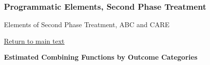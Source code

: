 \documentclass[static]{JJH-Beamer}
\begin{document}
\begin{frame}
\frametitle{Programmatic Elements, Second Phase Treatment}
	
\begin{table}[H]
\caption{Elements of Second Phase Treatment, ABC and CARE}
\begin{center}
\end{center}
\end{table}

\end{frame}

\begin{frame}

\begin{center}
\hyperlink{ret:scrambledeggs}{\underline{Return to main text}}
\end{center}

\end{frame}

\clearpage

{}
\begin{frame}

\hypertarget{estimated-comb}{}
\begin{center}
\textbf{Estimated Combining Functions by Outcome Categories}
\end{center}

\end{frame}
\end{document}
